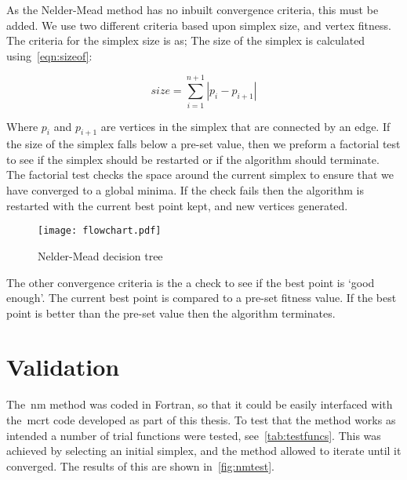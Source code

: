 As the Nelder-Mead method has no inbuilt convergence criteria, this must be added.
We use two different criteria based upon simplex size, and vertex fitness.
The criteria for the simplex size is as; The size of the simplex is calculated using~\cref{eqn:sizeof}:

\begin{equation}
size=\sum\limits_{i=1}^{n+1}|p_{i}-p_{i+1}|
\label{eqn:sizeof}
\end{equation}

Where $p_i$ and $p_{i+1}$ are vertices in the simplex that are connected by an edge. 
If the size of the simplex falls below a pre-set value, then we preform a factorial test to see if the simplex should be restarted or if the algorithm should terminate.
The factorial test checks the space around the current simplex to ensure that we have converged to a global minima.
If the check fails then the algorithm is restarted with the current best point kept, and new vertices generated.

\begin{figure}[!htbp]
    \centering
    \texttt{[image: flowchart.pdf]}
    \caption{Nelder-Mead decision tree}
    \label{fig:NM-algo}
\end{figure}

The other convergence criteria is the a check to see if the best point is `good enough'.
The current best point is compared to a pre-set fitness value.
If the best point is better than the pre-set value then the algorithm terminates.

\FloatBarrier
\section{Validation}
The~\gls*{nm} method was coded in Fortran, so that it could be easily interfaced with the~\gls*{mcrt} code developed as part of this thesis.
To test that the method works as intended a number of trial functions were tested, see~\cref{tab:testfuncs}.
This was achieved by selecting an initial simplex, and the method allowed to iterate until it converged.
The results of this are shown in~\cref{fig:nmtest}.


